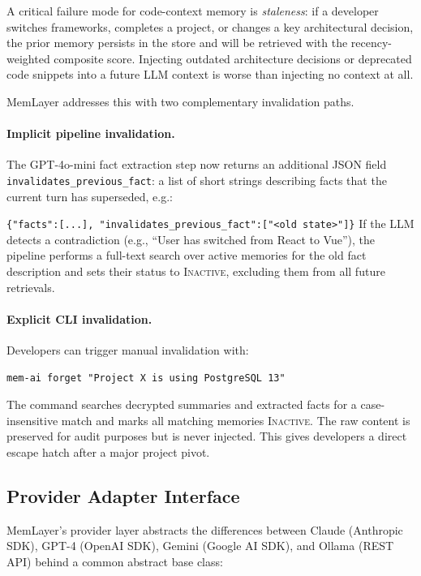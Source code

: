 \documentclass[10pt,twocolumn]{article}
\begin{document}
\noindent
A critical failure mode for code-context memory is \emph{staleness}: if a
developer switches frameworks, completes a project, or changes a key
architectural decision, the prior memory persists in the store and will be
retrieved with the recency-weighted composite score. Injecting outdated
architecture decisions or deprecated code snippets into a future LLM context
is worse than injecting no context at all.

MemLayer addresses this with two complementary invalidation paths.

\paragraph{Implicit pipeline invalidation.}
The GPT-4o-mini fact extraction step now returns an additional JSON field
\texttt{invalidates\_previous\_fact}: a list of short strings describing
facts that the current turn has superseded, e.g.:\vspace{2pt}

\noindent\texttt{\small \{"facts":[...], "invalidates\_previous\_fact":["<old state>"]\}}
If the LLM detects a contradiction (e.g., ``User has switched from React to
Vue''), the pipeline performs a full-text search over active memories for the
old fact description and sets their status to \textsc{Inactive}, excluding
them from all future retrievals.

\paragraph{Explicit CLI invalidation.}
Developers can trigger manual invalidation with:
\begin{verbatim}
mem-ai forget "Project X is using PostgreSQL 13"
\end{verbatim}
The command searches decrypted summaries and extracted facts for a
case-insensitive match and marks all matching memories \textsc{Inactive}.
The raw content is preserved for audit purposes but is never injected.
This gives developers a direct escape hatch after a major project pivot.

\subsection{Provider Adapter Interface}

\noindent
MemLayer's provider layer abstracts the differences between Claude (Anthropic
SDK), GPT-4 (OpenAI SDK), Gemini (Google AI SDK), and Ollama (REST API) behind
a common abstract base class:
\end{document}
